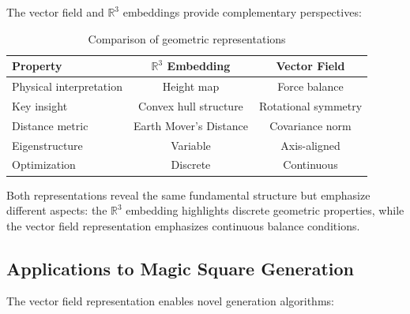 The vector field and $\mathbb{R}^3$ embeddings provide complementary perspectives:

\begin{table}[h]
\centering
\begin{tabular}{lcc}
\toprule
Property & $\mathbb{R}^3$ Embedding & Vector Field \\
\midrule
Physical interpretation & Height map & Force balance \\
Key insight & Convex hull structure & Rotational symmetry \\
Distance metric & Earth Mover's Distance & Covariance norm \\
Eigenstructure & Variable & Axis-aligned \\
Optimization & Discrete & Continuous \\
\bottomrule
\end{tabular}
\caption{Comparison of geometric representations}
\label{tab:representations}
\end{table}

Both representations reveal the same fundamental structure but emphasize different aspects: the $\mathbb{R}^3$ embedding highlights discrete geometric properties, while the vector field representation emphasizes continuous balance conditions.

\subsection{Applications to Magic Square Generation}

The vector field representation enables novel generation algorithms:

\begin{center}
\end{center}

